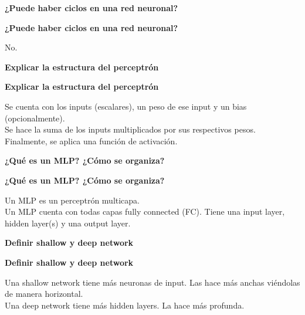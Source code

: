\documentclass[10pt]{memoir}
\begin{document}
    \clearpage
    \begin{center}
        \textbf{\Large ¿Puede haber ciclos en una red neuronal?} \\
    \end{center}
    
    \clearpage
    \begin{center}
        \textbf{\Large ¿Puede haber ciclos en una red neuronal?} \\
    \end{center}
        No. 

    \clearpage
    \begin{center}
        \textbf{\Large Explicar la estructura del perceptrón} \\
    \end{center}

    \clearpage
    \begin{center}
        \textbf{\Large Explicar la estructura del perceptrón} \\
    \end{center}
        Se cuenta con los inputs (escalares), un peso de ese input y un bias (opcionalmente). \\
        Se hace la suma de los inputs multiplicados por sus respectivos pesos. \\
        Finalmente, se aplica una función de activación.

    \clearpage
    \begin{center}
        \textbf{\Large ¿Qué es un MLP? ¿Cómo se organiza?} \\
    \end{center}

    \clearpage
    \begin{center}
        \textbf{\Large ¿Qué es un MLP? ¿Cómo se organiza?} \\
    \end{center}
        Un MLP es un perceptrón multicapa. \\
        Un MLP cuenta con todas capas fully connected (FC). Tiene una input layer, hidden layer(s) y una output layer.

    \clearpage
    \begin{center}
        \textbf{\Large Definir shallow y deep network} \\
    \end{center}

    \clearpage
    \begin{center}
        \textbf{\Large Definir shallow y deep network} \\
    \end{center}
        Una shallow network tiene más neuronas de input. Las hace más anchas viéndolas de manera horizontal. \\
        Una deep network tiene más hidden layers. La hace más profunda.
\end{document}
